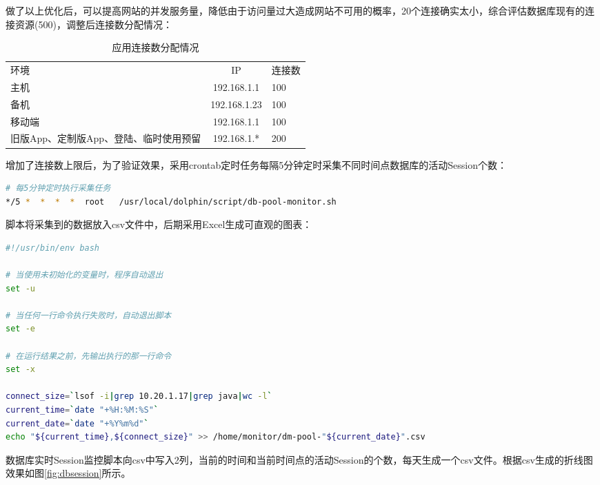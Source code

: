 \documentclass[8pt]{book}
\numberwithin{dummy}{section}
\theoremstyle{ocrenumbox}
\theoremstyle{blacknumex}
\theoremstyle{blacknumbox}
\theoremstyle{ocrenum}
\begin{document}
做了以上优化后，可以提高网站的并发服务量，降低由于访问量过大造成网站不可用的概率，20个连接确实太小，综合评估数据库现有的连接资源(500)，调整后连接数分配情况：

\begin{table}[htbp]
	\caption{应用连接数分配情况}
	\label{table:projectdirectionayinfo}
	\begin{center}
		\begin{tabular}{|p{5cm}|c|p{2cm}|}
			\hline
			\multirow{1}{*}{环境}
			& \multicolumn{1}{c|}{IP} 
			& \multicolumn{1}{c|}{连接数}\\			
			\cline{1-3}
			主机 &  192.168.1.1  & 100 \\
			\hline
			备机 &  192.168.1.23  & 100 \\
			\hline
			移动端 &  192.168.1.1  & 100 \\
			\hline
			旧版App、定制版App、登陆、临时使用预留 &  192.168.1.*  & 200 \\
			\hline									
		\end{tabular}	
	\end{center}
\end{table}

增加了连接数上限后，为了验证效果，采用crontab定时任务每隔5分钟定时采集不同时间点数据库的活动Session个数：

\begin{lstlisting}[language=Bash]
# 每5分钟定时执行采集任务
*/5 *  *  *  *  root   /usr/local/dolphin/script/db-pool-monitor.sh
\end{lstlisting}

脚本将采集到的数据放入csv文件中，后期采用Excel生成可直观的图表：

\begin{lstlisting}[language=Bash]
#!/usr/bin/env bash

# 当使用未初始化的变量时，程序自动退出
set -u

# 当任何一行命令执行失败时，自动退出脚本
set -e

# 在运行结果之前，先输出执行的那一行命令
set -x

connect_size=`lsof -i|grep 10.20.1.17|grep java|wc -l`
current_time=`date "+%H:%M:%S"`
current_date=`date "+%Y%m%d"`
echo "${current_time},${connect_size}" >> /home/monitor/dm-pool-"${current_date}".csv
\end{lstlisting}

数据库实时Session监控脚本向csv中写入2列，当前的时间和当前时间点的活动Session的个数，每天生成一个csv文件。根据csv生成的折线图效果如图\ref{fig:dbsession}所示。
\end{document}
